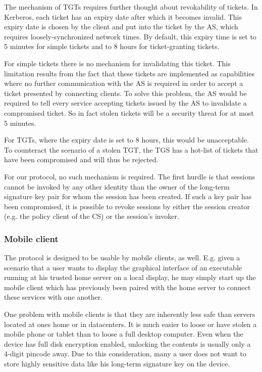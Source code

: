 The mechanism of TGTs requires further thought about revokability of tickets.
In Kerberos, each ticket has an expiry date after which it becomes invalid.
This expiry date is chosen by the client and put into the ticket by the AS, which requires loosely-synchronized network times.
By default, this expiry time is set to 5 minutes for simple tickets and to 8 hours for ticket-granting tickets.

For simple tickets there is no mechanism for invalidating this ticket.
This limitation results from the fact that these tickets are implemented as capabilities where no further communication with the AS is required in order to accept a ticket presented by connecting clients.
To solve this problem, the AS would be required to tell every service accepting tickets issued by the AS to invalidate a compromised ticket.
So in fact stolen tickets will be a security threat for at most 5 minutes.

For TGTs, where the expiry date is set to 8 hours, this would be unacceptable.
To counteract the scenario of a stolen TGT, the TGS has a hot-list of tickets that have been compromised and will thus be rejected.

For our protocol, no such mechanism is required.
The first hurdle is that sessions cannot be invoked by any other identity than the owner of the long-term signature key pair for whom the session has been created.
If such a key pair has been compromised, it is possible to revoke sessions by either the session creator (e.g. the policy client of the CS) or the session's invoker.

\subsubsection{Mobile client}

The protocol is designed to be usable by mobile clients, as well.
E.g. given a scenario that a user wants to display the graphical interface of an executable running at his trusted home server on a local display, he may simply start up the mobile client which has previously been paired with the home server to connect these services with one another.

One problem with mobile clients is that they are inherently less safe than servers located at ones home or in datacenters.
It is much easier to loose or have stolen a mobile phone or tablet than to loose a full desktop computer.
Even when the device has full disk encryption enabled, unlocking the contents is usually only a 4-digit pincode away.
Due to this consideration, many a user does not want to store highly sensitive data like his long-term signature key on the device.

